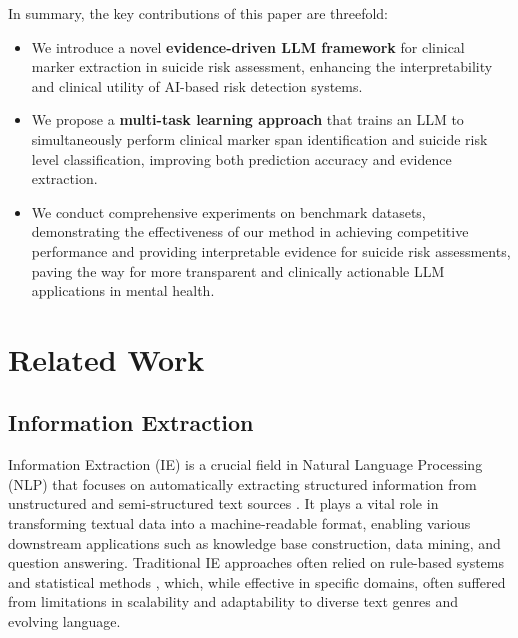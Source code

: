 In summary, the key contributions of this paper are threefold:

\begin{itemize}
\item We introduce a novel \textbf{evidence-driven LLM framework} for clinical marker extraction in suicide risk assessment, enhancing the interpretability and clinical utility of AI-based risk detection systems.
\item We propose a \textbf{multi-task learning approach} that trains an LLM to simultaneously perform clinical marker span identification and suicide risk level classification, improving both prediction accuracy and evidence extraction.
\item We conduct comprehensive experiments on benchmark datasets, demonstrating the effectiveness of our method in achieving competitive performance and providing interpretable evidence for suicide risk assessments, paving the way for more transparent and clinically actionable LLM applications in mental health.
\end{itemize}

\section{Related Work}

\subsection{Information Extraction}

Information Extraction (IE) is a crucial field in Natural Language Processing (NLP) that focuses on automatically extracting structured information from unstructured and semi-structured text sources \cite{CITE-IE-BOOK-NOW}. It plays a vital role in transforming textual data into a machine-readable format, enabling various downstream applications such as knowledge base construction, data mining, and question answering. Traditional IE approaches often relied on rule-based systems and statistical methods \cite{CITE-IE-RESEARCHGATE}, which, while effective in specific domains, often suffered from limitations in scalability and adaptability to diverse text genres and evolving language.

